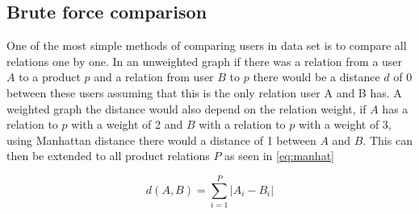 \subsection{Brute force comparison}\label{brute_force}
One of the most simple methods of comparing users in data set is to compare all relations one by one. 
In an unweighted graph if there was a relation from a user $A$ to a product $p$ and a relation from user $B$ to $p$ there would be a distance $d$ of 0 between these users assuming that this is the only relation user A and B has. 
A weighted graph the distance would also depend on the relation weight, if $A$ has a relation to $p$ with a weight of 2 and $B$ with a relation to $p$ with a weight of 3, using Manhattan distance there would a distance of 1 between $A$ and $B$. 
This can then be extended to all product relations $P$ as seen in \autoref{eq:manhat}

\begin{equation}\label{eq:manhat}
	d(A,B) = \sum_{i=1}^{P} |A_i - B_i|
\end{equation}

